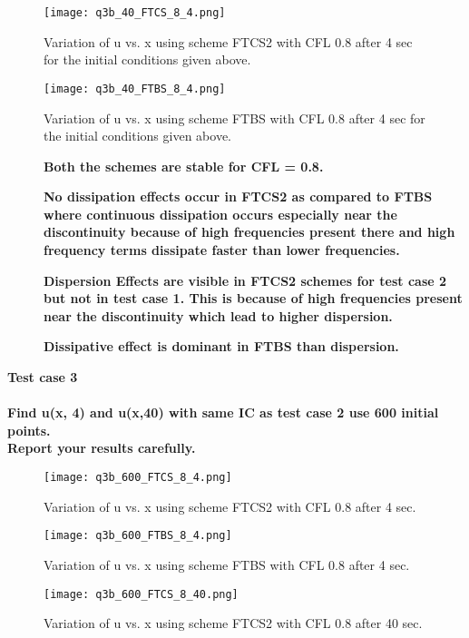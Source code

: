 \documentclass{article}
\begin{document}
\begin{figure}[H] \label{figure}
\texttt{[image: q3b\_40\_FTCS\_8\_4.png]}
\caption{Variation of u vs. x using scheme FTCS2 with CFL 0.8 after 4 sec for the initial conditions given above.}
\label{figure:}
\end{figure}

\begin{figure}[H] \label{figure}
\texttt{[image: q3b\_40\_FTBS\_8\_4.png]}
\caption{Variation of u vs. x using scheme FTBS with CFL 0.8 after 4 sec for the initial conditions given above.}
\label{figure:}
\end{figure}


\begin{description}
\item[]\textbf{Both the schemes are stable for CFL = 0.8.}
\item[]\textbf{ No dissipation effects occur in FTCS2 as compared to FTBS where continuous dissipation occurs especially near the discontinuity because of high frequencies present there and high frequency terms dissipate faster than lower frequencies.}  
\item[]\textbf{Dispersion Effects are visible in FTCS2 schemes for test case 2 but not in test case 1. This is because of high frequencies present near the discontinuity which lead to higher dispersion.}
\item[]\textbf{Dissipative effect is dominant in FTBS than dispersion.}

\end{description}

\newpage
\textbf{Test case 3
\\
\\Find u(x, 4) and u(x,40) with same IC as test case 2 use 600 initial points.
\\Report your results carefully.}

\begin{figure}[H] \label{figure}
\texttt{[image: q3b\_600\_FTCS\_8\_4.png]}
\caption{Variation of u vs. x using scheme FTCS2 with CFL 0.8 after 4 sec.}
\label{figure:}
\end{figure}

\begin{figure}[H] \label{figure}
\texttt{[image: q3b\_600\_FTBS\_8\_4.png]}
\caption{Variation of u vs. x using scheme FTBS with CFL 0.8 after 4 sec.}
\label{figure:}
\end{figure}

\begin{figure}[H] \label{figure}
\texttt{[image: q3b\_600\_FTCS\_8\_40.png]}
\caption{Variation of u vs. x using scheme FTCS2 with CFL 0.8 after 40 sec.}
\label{figure:}
\end{figure}
\end{document}
